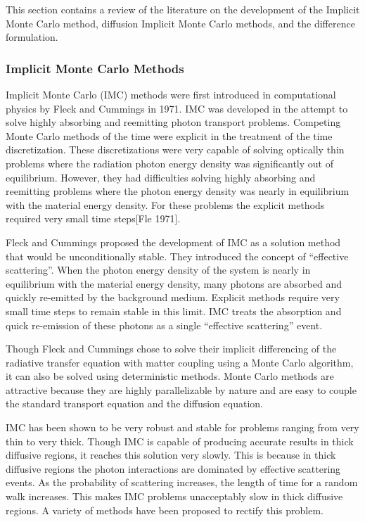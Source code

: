 \noindent
	\indent This section contains a review of the literature on the development of the Implicit Monte Carlo method, diffusion Implicit Monte Carlo methods, and the difference formulation.


\subsubsection{Implicit Monte Carlo Methods}
\label{sec:Intro-IMC}  

\noindent
	\indent Implicit Monte Carlo (IMC) methods were first introduced in computational physics by Fleck and Cummings in 1971. IMC was developed in the attempt to solve highly absorbing and reemitting photon transport problems. Competing Monte Carlo methods of the time were explicit in the treatment of the time discretization. These discretizations were very capable of solving optically thin problems where the radiation photon energy density was significantly out of equilibrium. However, they had difficulties solving highly absorbing and reemitting problems where the photon energy density was nearly in equilibrium with the material energy density. For these problems the explicit methods required very small time steps[Fle 1971].

	Fleck and Cummings proposed the development of IMC as a solution method that would be unconditionally stable. They introduced the concept of ``effective scattering''. When the photon energy density of the system is nearly in equilibrium with the material energy density, many photons are absorbed and quickly re-emitted by the background medium. Explicit methods require very small time steps to remain stable in this limit. IMC treats the absorption and quick re-emission of these photons as a single ``effective scattering'' event.

	Though Fleck and Cummings chose to solve their implicit differencing of the radiative transfer equation with matter coupling using a Monte Carlo algorithm, it can also be solved using deterministic methods. Monte Carlo methods are attractive because they are highly parallelizable by nature and are easy to couple the standard transport equation and the diffusion equation. 

	IMC has been shown to be very robust and stable for problems ranging from very thin to very thick. Though IMC is capable of producing accurate results in thick diffusive regions, it reaches this solution very slowly. This is because in thick diffusive regions the photon interactions are dominated by effective scattering events. As the probability of scattering increases, the length of time for a random walk increases. This makes IMC problems unacceptably slow in thick diffusive regions. A variety of methods have been proposed to rectify this problem. 

